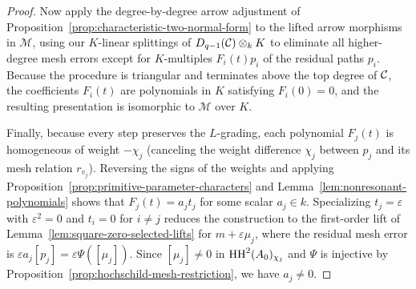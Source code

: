 \begin{proof}
Now apply the degree-by-degree arrow adjustment of Proposition~\ref{prop:characteristic-two-normal-form} to the lifted arrow morphisms in $\mathcal M$, using our $K$-linear splittings of $D_{q-1}(\mathcal C)\otimes_k K$ to eliminate all higher-degree mesh errors except for $K$-multiples $F_i(t)p_i$ of the residual paths $p_i$. Because the procedure is triangular and terminates above the top degree of $\mathcal C$, the coefficients $F_i(t)$ are polynomials in $K$ satisfying $F_i(0)=0$, and the resulting presentation is isomorphic to $\mathcal M$ over $K$.

Finally, because every step preserves the $L$-grading, each polynomial $F_j(t)$ is homogeneous of weight $-\chi_j$ (canceling the weight difference $\chi_j$ between $p_j$ and its mesh relation $r_{v_j}$). Reversing the signs of the weights and applying Proposition~\ref{prop:primitive-parameter-characters} and Lemma~\ref{lem:nonresonant-polynomials} shows that $F_j(t)=a_jt_j$ for some scalar $a_j\in k$. Specializing $t_j=\varepsilon$ with $\varepsilon^2=0$ and $t_i=0$ for $i\ne j$ reduces the construction to the first-order lift of Lemma~\ref{lem:square-zero-selected-lifts} for $m+\varepsilon\mu_j$, where the residual mesh error is $\varepsilon a_j[p_j]=\varepsilon\Psi([\mu_j])$. Since $[\mu_j]\ne0$ in $\operatorname{HH}^2(A_0)_{\chi_j}$ and $\Psi$ is injective by Proposition~\ref{prop:hochschild-mesh-restriction}, we have $a_j\ne0$.
\end{proof}
